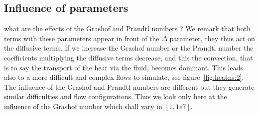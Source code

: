 




\subsection{Influence of parameters}
\label{sec:infl-des-param}


what are the effects of the Grashof and Prandtl numbers ? We remark
that both terms with these parameters appear in front of the $\Delta$
parameter, they thus act on the diffusive terms. If we increase the
Grashof number or the Prandtl number the coefficients multiplying the
diffusive terms decrease, and this the convection, that is to say the
transport of the heat via the fluid, becomes dominant. This leads also
to a more difficult and complex flows to simulate, see
figure~\ref{fig:heatns:2}. The influence of the Grashof and Prandtl
numbers are different but they generate similar difficulties and flow
configurations. Thus we look only here at the influence of the Grashof
number which shall vary in $[1, 1e7]$.

